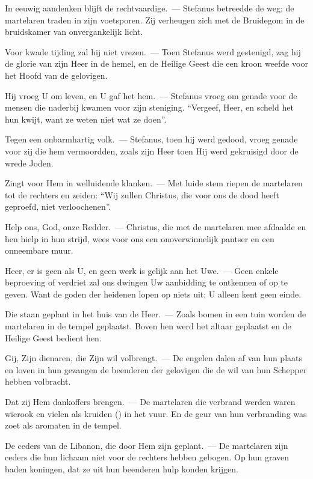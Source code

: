 \documentclass[12pt,twoside,a5paper]{article}
\begin{document}
\begin{halfparskip}

  In eeuwig aandenken blijft de rechtvaardige.~--- Stefanus betreedde de weg; de martelaren traden in zijn voetsporen. Zij verheugen zich met de Bruidegom in de bruidskamer van onvergankelijk licht.

  Voor kwade tijding zal hij niet vrezen.~--- Toen Stefanus werd gestenigd, zag hij de glorie van zijn Heer in de hemel, en de Heilige Geest die een kroon weefde voor het Hoofd van de gelovigen.

  Hij vroeg U om leven, en U gaf het hem.~--- Stefanus vroeg om genade voor de mensen die naderbij kwamen voor zijn steniging. ``Vergeef, Heer, en scheld het hun kwijt, want ze weten niet wat ze doen''.

  Tegen een onbarmhartig volk.~--- Stefanus, toen hij werd gedood, vroeg genade voor zij die hem vermoordden, zoals zijn Heer toen Hij werd gekruisigd door de wrede Joden.

  Zingt voor Hem in welluidende klanken.~--- Met luide stem riepen de martelaren tot de rechters en zeiden: ``Wij zullen Christus, die voor ons de dood heeft geproefd, niet verloochenen''.

  Help ons, God, onze Redder.~--- Christus, die met de martelaren mee afdaalde en hen hielp in hun strijd, wees voor ons een onoverwinnelijk pantser en een onneembare muur.

  Heer, er is geen als U, en geen werk is gelijk aan het Uwe.~--- Geen enkele beproeving of verdriet zal ons dwingen Uw aanbidding te ontkennen of op te geven. Want de goden der heidenen lopen op niets uit; U alleen kent geen einde.

  Die staan geplant in het huis van de Heer.~--- Zoals bomen in een tuin worden de martelaren in de tempel geplaatst. Boven hen werd het altaar geplaatst en de Heilige Geest bedient hen.

  Gij, Zijn dienaren, die Zijn wil volbrengt.~--- De engelen dalen af van hun plaats en loven in hun gezangen de beenderen der gelovigen die de wil van hun Schepper hebben volbracht.

  Dat zij Hem dankoffers brengen.~--- De martelaren die verbrand werden waren wierook en vielen als kruiden () in het vuur. En de geur van hun verbranding was zoet als aromaten in de tempel.

  De ceders van de Libanon, die door Hem zijn geplant.~--- De martelaren zijn ceders die hun lichaam niet voor de rechters hebben gebogen. Op hun graven baden koningen, dat ze uit hun beenderen hulp konden krijgen.


\end{halfparskip}
\end{document}
